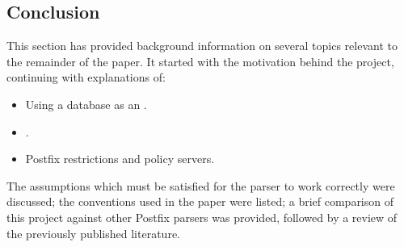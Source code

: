 \documentclass[a4paper,12pt,draft]{article}
\begin{document}
%

\subsection{Conclusion}

This section has provided background information on several topics relevant
to the remainder of the paper.  It started with the motivation behind the
project, continuing with explanations of:

\begin{itemize}

    \item Using a database as an \API{}.

    \item \SMTP{}.

    \item Postfix restrictions and policy servers.

\end{itemize}

The assumptions which must be satisfied for the parser to work correctly
were discussed; the conventions used in the paper were listed; a brief
comparison of this project against other Postfix parsers was provided,
followed by a review of the previously published literature.
\end{document}
